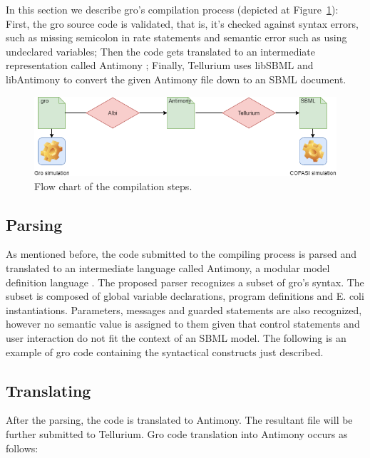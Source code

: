 \documentclass[12pt]{article}
\begin{document}
    In this section we describe gro's compilation process (depicted at Figure~\ref{fig:compilation_steps}): First, the gro source code is validated, that is, it’s checked against syntax errors, such as missing semicolon in rate statements and semantic error such as using undeclared variables; Then the code gets translated to an intermediate representation called Antimony \cite{Smith2009}; Finally, Tellurium uses libSBML and libAntimony to convert the given Antimony file down to an SBML document.
    
    \begin{figure}[h]
        \centering
        \includegraphics[scale = 0.6]{architecture.png}
        \caption{Flow chart of the compilation steps.}
        \label{fig:compilation_steps}
    \end{figure}


\subsection{Parsing}

    As mentioned before, the code submitted to the compiling process is parsed and translated to an intermediate language called Antimony, a modular model definition language \cite{Smith2009}. The proposed parser recognizes a subset of gro's syntax. The subset is composed of global variable declarations, program definitions and E. coli instantiations. Parameters, messages and guarded statements are also recognized, however no semantic value is assigned to them given that control statements and user interaction do not fit the context of an SBML model. The following is an example of gro code containing the syntactical constructs just described.

    

\subsection{Translating}
    
    After the parsing, the code is translated to Antimony. The resultant file will be further submitted to Tellurium. Gro code translation into Antimony occurs as follows:
\end{document}
